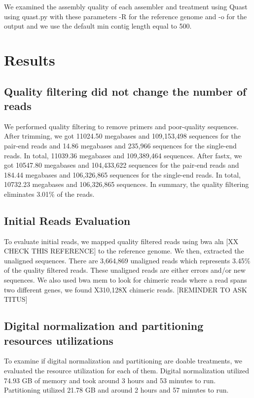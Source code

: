 We examined the assembly quality of each assembler and treatment using Quast \cite{quast} using quast.py  with these parameters -R for the reference genome and -o for the output and we use the default min contig length equal to 500. 



\section*{Results}

\subsection*{Quality filtering did not change the number of reads}            
We performed quality filtering to remove primers and poor-quality sequences. After trimming, we got 11024.50 megabases and 109,153,498 sequences for the pair-end reads and 14.86 megabases and 235,966 sequences for the single-end reads. In total,  11039.36 megabases and 109,389,464 sequences. 
After fastx, we got 10547.80 megabases and 104,433,622 sequences for the pair-end reads and 184.44  megabases and 106,326,865 sequences for the single-end reads. In total, 10732.23 megabases and 106,326,865 sequences. 
In summary, the quality filtering eliminates 3.01\% of the reads. 

\subsection*{Initial Reads Evaluation}
To evaluate initial reads, we mapped quality filtered reads using bwa aln \cite{bwa-mem} [XX CHECK THIS REFERENCE] to the reference genome. We then, extracted the unaligned sequences. There are 3,664,869 unaligned reads which represents 3.45\% of the quality filtered reads. These unaligned reads are either errors and/or new sequences. We also used bwa mem  \cite{bwa-mem} to look for chimeric reads where a read spans two different genes, we found X310,128X chimeric reads. [REMINDER TO ASK TITUS]


\subsection*{Digital normalization and partitioning resources utilizations}
To examine if digital normalization and partitioning are doable treatments, we evaluated the resource utilization for each of them. Digital normalization utilized 74.93  GB of memory and took  around 3 hours and 53 minutes to run. Partitioning utilized 21.78 GB and around 2 hours  and 57 minutes to run. 


